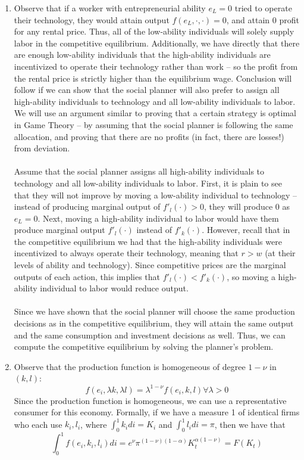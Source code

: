 \documentclass[10pt]{article}
\begin{document}
\begin{enumerate}
	\item Observe that if a worker with entrepreneurial ability $e_L = 0$ tried to operate their technology, they would attain output $f(e_L,\cdot,\cdot) = 0$, and attain 0 profit for any rental price. Thus, all of the low-ability individuals will solely supply labor in the competitive equilibrium. Additionally, we have directly that there are enough low-ability individuals that the high-ability individuals are incentivized to operate their technology rather than work -- so the profit from the rental price is strictly higher than the equilibrium wage. Conclusion will follow if we can show that the social planner will also prefer to assign all high-ability individuals to technology and all low-ability individuals to labor. We will use an argument similar to proving that a certain strategy is optimal in Game Theory -- by assuming that the social planner is following the same allocation, and proving that there are no profits (in fact, there are losses!) from deviation.\\\\ Assume that the social planner assigns all high-ability individuals to technology and all low-ability individuals to labor. First, it is plain to see that they will not improve by moving a low-ability individual to technology -- instead of producing marginal output of $f'_l(\cdot) > 0$, they will produce 0 as $e_L = 0$. Next, moving a high-ability individual to labor would have them produce marginal output $f'_l(\cdot)$ instead of $f'_k(\cdot)$. However, recall that in the competitive equilibrium we had that the high-ability individuals were incentivized to always operate their technology, meaning that $r > w$ (at their levels of ability and technology). Since competitive prices are the marginal outputs of each action, this implies that $f'_l(\cdot) < f'_k(\cdot)$, so moving a high-ability individual to labor would reduce output. \\\\Since we have shown that the social planner will choose the same production decisions as in the competitive equilibrium, they will attain the same output and the same consumption and investment decisions as well. Thus, we can compute the competitive equilibrium by solving the planner's problem.
	\item Observe that the production function is homogeneous of degree $1-\nu$ in $(k,l)$:\[f(e_i,\lambda k,\lambda l) = \lambda^{1-\nu} f(e_i,k,l) \forall \lambda > 0\]Since the production function is homogeneous, we can use a representative consumer for this economy. Formally, if we have a measure 1 of identical firms who each use $k_i,l_i$, where $\int_0^1 k_idi = K_i$ and $\int_0^1l_idi = \pi$, then we have that \[\int_0^1 f(e_i,k_i,l_i)di = e^\nu  \pi^{(1-\nu)(1-\alpha)} K_t^{\alpha(1-\nu)} = F(K_t)\]

\end{enumerate}
\end{document}
